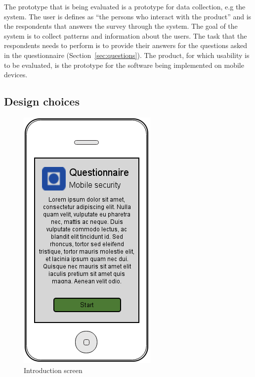  The prototype that is being evaluated is a prototype for data collection, e.g the system. The user is defines as ``the persons who interact with the product'' and is the respondents that answers the survey through the system. The goal of the system is to collect patterns and information about the users. The task that the respondents needs to perform is to provide their answers for the questions asked in the questionnaire (Section~\ref{sec:questions}). The product, for which usability is to be evaluated, is the prototype for the software being implemented on mobile devices.  

  \subsection{Design choices} \label{sec:designChoices}
    
    \begin{figure}
      \centering
      \vspace{-5pt}
      \includegraphics[scale=0.40]{screens/v3/mobile/mobile1-1.png}
      \caption{Introduction screen}
      \label{fig:wireframe1}
    \end{figure}
    
